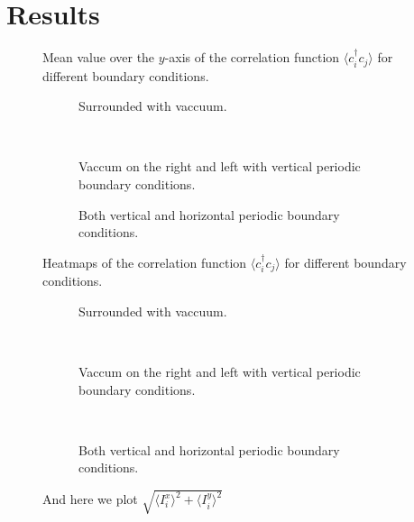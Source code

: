 \documentclass[..\main.tex]{subfile}
\begin{document}
\section{Results}
\begin{figure}[H]
    \centering
    
    \caption{Mean value over the $y$-axis of the correlation function $\langle c^\dagger_i c_j\rangle$ for different boundary conditions.}
\end{figure}
   
\begin{figure}[H]
    \centering
    \begin{subfigure}{0.3\textwidth}
        \centering
        
        \caption{Surrounded with vaccuum.}
        \label{fig:first}
    \end{subfigure}\\
    \begin{subfigure}{0.45\textwidth}
        \centering
        
        \caption{Vaccum on the right and left with vertical periodic boundary conditions.}
        \label{fig:first}
    \end{subfigure}
    \begin{subfigure}{0.45\textwidth}
        \centering
        
        \caption{Both vertical and horizontal periodic boundary conditions.}
        \label{fig:first}
    \end{subfigure}
    \caption{Heatmaps of the correlation function $\langle c^\dagger_i c_j\rangle$ for different boundary conditions.}
\end{figure}



\begin{figure}[H]
    \centering
    \begin{subfigure}{0.45\textwidth}
        \centering
        

        \caption{Surrounded with vaccuum.}
        \label{fig:first}
    \end{subfigure}\\
    \begin{subfigure}{0.45\textwidth}
        \centering
        
        \caption{Vaccum on the right and left with vertical periodic boundary conditions.}
        \label{fig:first}
    \end{subfigure}\\
    \begin{subfigure}{0.45\textwidth}
        \centering
        
        \caption{Both vertical and horizontal periodic boundary conditions.}
        \label{fig:first}
    \end{subfigure}
    \caption{And here we plot $\sqrt{\langle I^x_i\rangle^2 + \langle I^y_i\rangle^2}$}
\end{figure}
\end{document}
